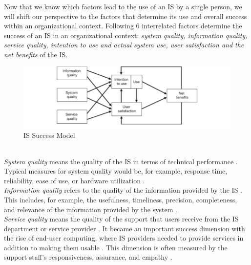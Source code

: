 \documentclass[
	english,
	ruledheaders=section,%
	class=report,%
	thesis={type=bachelor},%
	accentcolor=1b,%
	custommargins=true,%
	marginpar=false,%
	parskip=half-,%
	fontsize=11pt,%
	DIV=14,
]{tudapub}
\begin{document}
Now that we know which factors lead to the use of an IS by a single person, we will shift our perspective to the factors that determine its use and overall success within an organizational context.
Following \cite[p.~23]{DeloneMcLean2003ISSuccessTenYearUpdate} 6 interrelated factors determine the success of an IS in an organizational context: \textit{system quality, information quality, service quality, intention to use and actual system use, user satisfaction and the net benefits} of the IS.\\
\begin{figure}[h!]
    \includegraphics[width=1\linewidth]{images/ISSuccess.png}
    \caption{IS Success Model \parencite[p.~24]{DeloneMcLean2003ISSuccessTenYearUpdate}}
    \label{fig:enter-label}
\end{figure}
\\
\textit{System quality} means the quality of the IS in terms of technical performance \parencite[p.~64]{DeloneMcLean2003ISSuccessTenYearUpdate}. Typical measures for system quality would be, for example, response time, reliability, ease of use, or hardware utilization \parencite[p.~64-65]{DeloneMcLean1992ISSuccess}.\\
\textit{Information quality} refers to the quality of the information provided by the IS \parencite[p.~64]{DeloneMcLean1992ISSuccess}. This includes, for example, the usefulness, timeliness, precision, completeness, and relevance of the information provided by the system \parencite[p.~67]{DeloneMcLean1992ISSuccess}.\\
\textit{Service quality} means the quality of the support that users receive from the IS department or service provider \parencite[p.~18]{DeloneMcLean2003ISSuccessTenYearUpdate}. It became an important success dimension with the rise of end-user computing, where IS providers needed to provide services in addition to making them usable \parencite[p.~18]{DeloneMcLean2003ISSuccessTenYearUpdate}. This dimension is often measured by the support staff's responsiveness, assurance, and empathy \parencite[p.~18]{DeloneMcLean2003ISSuccessTenYearUpdate}.
\\
\end{document}
